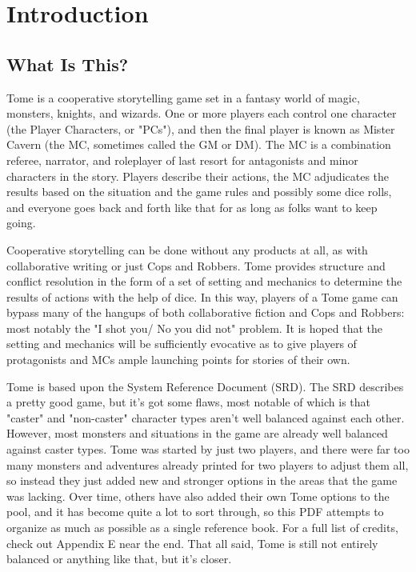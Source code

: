 \chapter{Introduction}

\section{What Is This?}

Tome is a cooperative storytelling game set in a fantasy world of magic, monsters, knights, and wizards. One or more players each control one character (the Player Characters, or "PCs"), and then the final player is known as Mister Cavern (the MC, sometimes called the GM or DM). The MC is a combination referee, narrator, and roleplayer of last resort for antagonists and minor characters in the story. Players describe their actions, the MC adjudicates the results based on the situation and the game rules and possibly some dice rolls, and everyone goes back and forth like that for as long as folks want to keep going.

Cooperative storytelling can be done without any products at all, as with collaborative writing or just Cops and Robbers. Tome provides structure and conflict resolution in the form of a set of setting and mechanics to determine the results of actions with the help of dice. In this way, players of a Tome game can bypass many of the hangups of both collaborative fiction and Cops and Robbers: most notably the "I shot you/ No you did not" problem. It is hoped that the setting and mechanics will be sufficiently evocative as to give players of protagonists and MCs ample launching points for stories of their own.

Tome is based upon the System Reference Document (SRD). The SRD describes a pretty good game, but it's got some flaws, most notable of which is that "caster" and "non-caster" character types aren't well balanced against each other. However, most monsters and situations in the game are already well balanced against caster types. Tome was started by just two players, and there were far too many monsters and adventures already printed for two players to adjust them all, so instead they just added new and stronger options in the areas that the game was lacking. Over time, others have also added their own Tome options to the pool, and it has become quite a lot to sort through, so this PDF attempts to organize as much as possible as a single reference book. For a full list of credits, check out Appendix E near the end. That all said, Tome is still not entirely balanced or anything like that, but it's closer.

